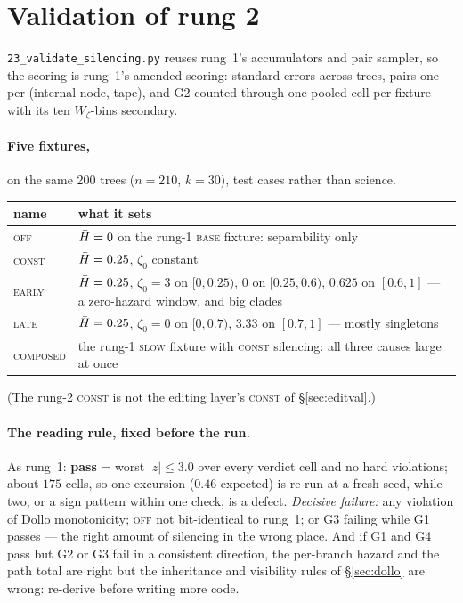 \section{Validation of rung 2}\label{sec:drop2val}

\texttt{23\_validate\_silencing.py} reuses rung~1's accumulators and pair sampler, so the scoring is
rung~1's amended scoring: standard errors across trees, pairs one per (internal node, tape), and G2
counted through one pooled cell per fixture with its ten $W_\zeta$-bins secondary.

\paragraph{Five fixtures,} on the same 200 trees ($n=210$, $k=30$), test cases rather than science.
\begin{center}\small
\begin{tabular}{@{}lp{}@{}}
\toprule
name & what it sets \\
\midrule
\textsc{off}      & $\bar H=0$ on the rung-1 \textsc{base} fixture: separability only \\
\textsc{const}    & $\bar H=0.25$, $\zeta_0$ constant \\
\textsc{early}    & $\bar H=0.25$, $\zeta_0=3$ on $[0,0.25)$, $0$ on $[0.25,0.6)$, $0.625$ on $[0.6,1]$ ---
                    a zero-hazard window, and big clades \\
\textsc{late}     & $\bar H=0.25$, $\zeta_0=0$ on $[0,0.7)$, $3.33$ on $[0.7,1]$ --- mostly singletons \\
\textsc{composed} & the rung-1 \textsc{slow} fixture with \textsc{const} silencing: all three causes
                    large at once \\
\bottomrule
\end{tabular}
\end{center}
(The rung-2 \textsc{const} is not the editing layer's \textsc{const} of \S\ref{sec:editval}.)

\paragraph{The reading rule, fixed before the run.} As rung~1: \textbf{pass} = worst $|z|\le3.0$ over
every verdict cell and no hard violations; about $175$ cells, so one excursion ($0.46$ expected) is
re-run at a fresh seed, while two, or a sign pattern within one check, is a defect. \emph{Decisive
failure:} any violation of Dollo monotonicity; \textsc{off} not bit-identical to rung~1; or G3 failing
while G1 passes --- the right amount of silencing in the wrong place. And if G1 and G4 pass but G2 or
G3 fail in a consistent direction, the per-branch hazard and the path total are right but the
inheritance and visibility rules of \S\ref{sec:dollo} are wrong: re-derive before writing more code.

